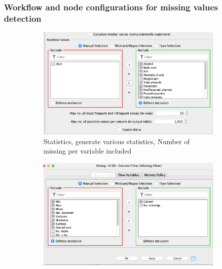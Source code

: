 \documentclass[11pt]{article}
\begin{document}
			\subsubsection*{Workflow and node configurations for missing values detection}

			\iffalse
			\begin{figure}[H]
				\centering
				\begin{subfigure}{0.4\textwidth}
					\includegraphics[width=\textwidth]{res/t0/t01/t01-statistics-conf}
					\caption{Statistics, generate various statistics, Number of missing per variable included}
					\label{fig:first}
				\end{subfigure}
				\hfill
				\begin{subfigure}{0.4\textwidth}
					\includegraphics[width=\textwidth]{res/t0/t01/t01-column-filter-conf}

\end{subfigure}
\end{figure}
\end{document}
